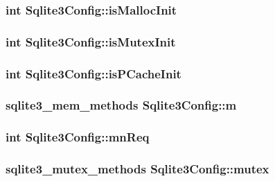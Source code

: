 \subsubsection{\setlength{\rightskip}{0pt plus 5cm}int \bf{Sqlite3Config::is\-Malloc\-Init}}\label{structSqlite3Config_1c4ca966c0d73564acd73d576879be06}


\subsubsection{\setlength{\rightskip}{0pt plus 5cm}int \bf{Sqlite3Config::is\-Mutex\-Init}}\label{structSqlite3Config_44f4750209b81180d09409abb712e322}


\subsubsection{\setlength{\rightskip}{0pt plus 5cm}int \bf{Sqlite3Config::is\-PCache\-Init}}\label{structSqlite3Config_f20f2ee9bbb3674a4e8169f37240e92c}


\subsubsection{\setlength{\rightskip}{0pt plus 5cm}\bf{sqlite3\_\-mem\_\-methods} \bf{Sqlite3Config::m}}\label{structSqlite3Config_57a2c29d86af7ca5e585d3aefec97bb2}


\subsubsection{\setlength{\rightskip}{0pt plus 5cm}int \bf{Sqlite3Config::mn\-Req}}\label{structSqlite3Config_478d56c76d9b6198bf065dd401b5985d}


\subsubsection{\setlength{\rightskip}{0pt plus 5cm}\bf{sqlite3\_\-mutex\_\-methods} \bf{Sqlite3Config::mutex}}\label{structSqlite3Config_c07225eb9a8e904ab8c17d33778bfd7a}


